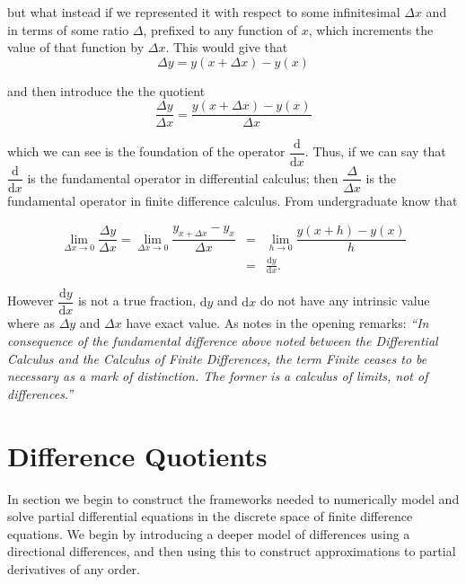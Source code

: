 \documentclass[../main.tex]{subfiles}
\begin{document}
  but what instead if we represented it with respect to some infinitesimal $\Delta x$ and in terms of some ratio $\Delta$, prefixed to any function of $x$, which increments the value of that function by $\Delta x$. This would give that \\

  \begin{equation}
    \Delta y = y(x + \Delta x) - y(x)
  \end{equation}

  and then introduce the the quotient \\

  \begin{equation}
    \dfrac{\Delta y}{\Delta x} = \dfrac{y(x + \Delta x) - y(x)}{\Delta x}
  \end{equation}

  which we can see is the foundation of the operator $\dfrac{\mathrm{d}}{\mathrm{d}x}$. Thus, if we can say that $\dfrac{\mathrm{d}}{\mathrm{d}x}$ is the fundamental operator in differential calculus; then $\dfrac{\Delta}{\Delta x}$ is the fundamental operator in finite difference calculus. From undergraduate know that

  \begin{eqnarray}
    \lim_{\Delta x \to 0} \dfrac{\Delta y}{\Delta x}
    = \lim_{\Delta x \to 0} \dfrac{y_{x + \Delta x} - y_x}{\Delta x}
    &=& \lim_{h \to 0} \dfrac{y(x+h) - y(x)}{h} \nonumber \\
    &=& \frac{\mathrm{d} y}{\mathrm{d}x}.
  \end{eqnarray}

  However $\dfrac{\mathrm{d} y}{\mathrm{d}x}$ is not a true fraction, $\mathrm{d}y$ and $\mathrm{d}x$ do not have any intrinsic value where as $\Delta y$ and $\Delta x$ have exact value. As \cite{boole1880} notes in the opening remarks: \emph{``In consequence of the fundamental difference above noted between the Differential Calculus and the Calculus of Finite Differences, the term Finite ceases to be necessary as a mark of distinction. The former is a calculus of limits, not of differences.''}

  \section{Difference Quotients}\label{sec:fdes:quotients}
  In section we begin to construct the frameworks needed to numerically model and solve partial differential equations in the discrete space of finite difference equations. We begin by introducing a deeper model of differences using a directional differences, and then using this to construct approximations to partial derivatives of any order.
\end{document}
